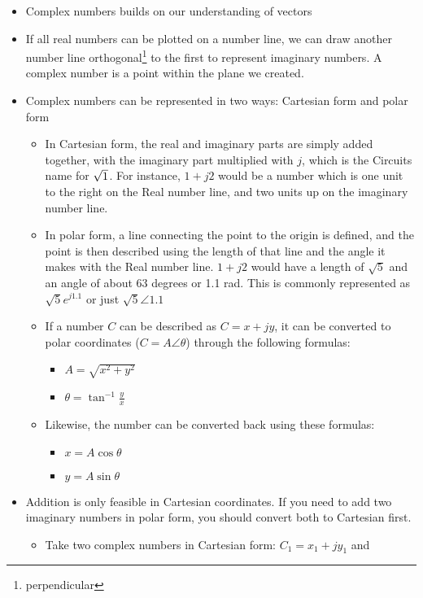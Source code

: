 \begin{itemize}
\item Complex numbers builds on our understanding of vectors
\item If all real numbers can be plotted on a number line, we can draw another number line orthogonal\footnote{perpendicular} to the first to represent imaginary numbers.  A complex number is a point within the plane we created.
\item Complex numbers can be represented in two ways: Cartesian form and polar form
  \begin{itemize}
  \item In Cartesian form, the real and imaginary parts are simply added together, with the imaginary part multiplied with $j$, which is the Circuits name for $\sqrt{\-1}$.  For instance, $1 + j2$ would be a number which is one unit to the right on the Real number line, and two units up on the imaginary number line.
  \item In polar form, a line connecting the point to the origin is defined, and the point is then described using the length of that line and the angle it makes with the Real number line.  $1 + j2$ would have a length of $\sqrt{5}$ and an angle of about 63 degrees or 1.1 rad.  This is commonly represented as $\sqrt{5}e^{j1.1}$ or just $\sqrt{5}\angle{1.1}$
  \item If a number $C$ can be described as $C=x+jy$, it can be converted to polar coordinates ($C=A\angle \theta$) through the following formulas:
    \begin{itemize}
    \item $A = \sqrt{x^2+y^2}$
    \item $\theta = \tan^{-1}\frac{y}{x}$
    \end{itemize}
  \item Likewise, the number can be converted back using these formulas:
    \begin{itemize}
    \item $x = A\cos \theta$
    \item $y = A\sin \theta$
    \end{itemize}
  \end{itemize}
\item Addition is only feasible in Cartesian coordinates.  If you need to add two imaginary numbers in polar form, you should convert both to Cartesian first.
  \begin{itemize}
  \item Take two complex numbers in Cartesian form: $C_1=x_1+jy_1$ and

\end{itemize}
\end{itemize}

